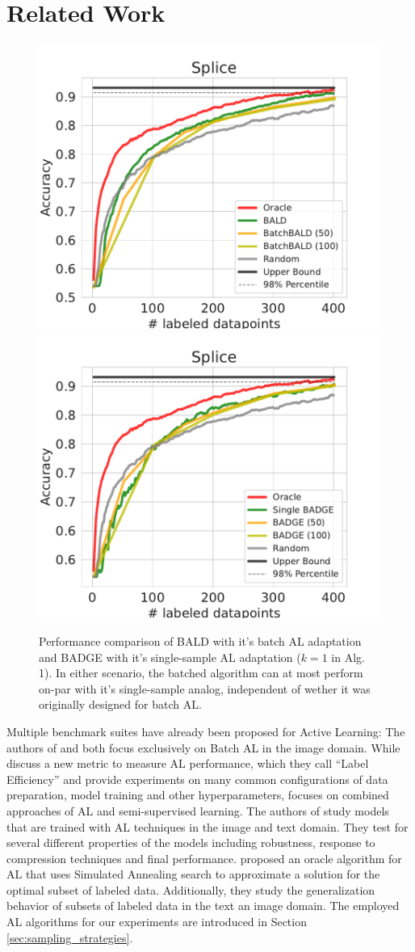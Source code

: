 \documentclass[]{article}
\begin{document}
\section{Related Work}
\begin{figure}
	\centering
	\includegraphics[width=0.49\linewidth]{img/ablation_splice_bald}
	\includegraphics[width=0.49\linewidth]{img/ablation_splice_badge}
	\caption{Performance comparison of BALD \cite{gal2017deep} with it's batch AL adaptation \cite{kirsch2019batchbald} and BADGE \cite{ashdeep} with it's single-sample AL adaptation ($k=1$ in \cite{ashdeep} Alg. 1).
	In either scenario, the batched algorithm can at most perform on-par with it's single-sample analog, independent of wether it was originally designed for batch AL.}
	\label{fig:ablation_bald}
\end{figure}
Multiple benchmark suites have already been proposed for Active Learning:
The authors of \cite{beck2021effective} and \cite{li2022empirical} both focus exclusively on Batch AL in the image domain.
While \cite{beck2021effective} discuss a new metric to measure AL performance, which they call ``Label Efficiency'' and provide experiments on many common configurations of data preparation, model training and other hyperparameters, \cite{li2022empirical} focuses on combined approaches of AL and semi-supervised learning.
The authors of \cite{hu2021towards} study models that are trained with AL techniques in the image and text domain.
They test for several different properties of the models including robustness, response to compression techniques and final performance.
\cite{zhou2021towards} proposed an oracle algorithm for AL that uses Simulated Annealing search to approximate a solution for the optimal subset of labeled data.
Additionally, they study the generalization behavior of subsets of labeled data in the text an image domain.
The employed AL algorithms for our experiments are introduced in Section \ref{sec:sampling_strategies}.
\end{document}
